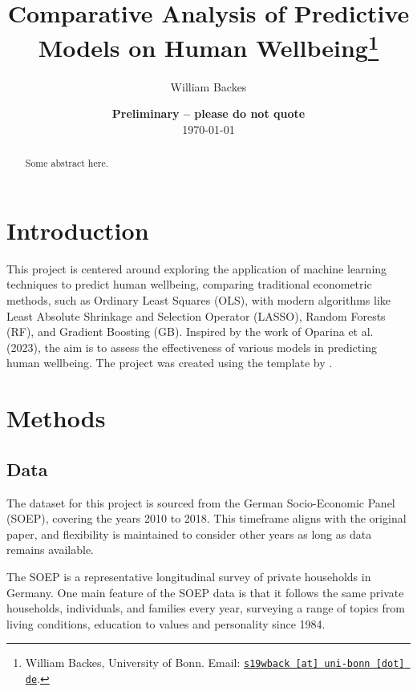 \documentclass[11pt, a4paper, leqno]{article}
\begin{document}
\title{Comparative Analysis of Predictive Models on Human Wellbeing\thanks{William Backes, University of Bonn. Email: \href{mailto:s19wback@uni-bonn.de}{\nolinkurl{s19wback [at] uni-bonn [dot] de}}.}}

\author{William Backes}

\date{
    {\bf Preliminary -- please do not quote}
    \\[1ex]
    \today
}

\maketitle


\begin{abstract}
    Some abstract here.
\end{abstract}

\clearpage


\section{Introduction} %
\label{sec:introduction}

This project is centered around exploring the application of machine learning techniques
to predict human wellbeing, comparing traditional econometric methods, such as Ordinary
Least Squares (OLS), with modern algorithms like Least Absolute Shrinkage and Selection
Operator (LASSO), Random Forests (RF), and Gradient Boosting (GB). Inspired by the work
of Oparina et al. (2023), the aim is to assess the effectiveness of various models in
predicting human wellbeing. The project was created using the template by
\citet{GaudeckerEconProjectTemplates}.

\section{Methods} %
\label{sec:methods}

\subsection{Data}
The dataset for this project is sourced from the German Socio-Economic Panel (SOEP),
covering the years 2010 to 2018. This timeframe aligns with the original paper, and
flexibility is maintained to consider other years as long as data remains available.

The SOEP is a representative longitudinal survey of private households in Germany.
One main feature of the SOEP data is that it follows the same private households,
individuals, and families every year, surveying a range of topics from living conditions,
education to values and personality since 1984.
\end{document}
